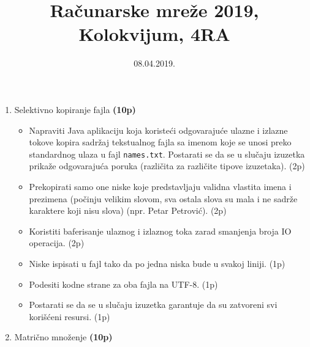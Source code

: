 \documentclass[]{article}
\title{Ra\v{c}unarske mre\v{z}e 2019, Kolokvijum, 4RA}
\author{}
\date{08.04.2019.}
\begin{document}
\maketitle

\begin{enumerate}
  \item Selektivno kopiranje fajla \textbf{(10p)}
  \begin{itemize}
    \item Napraviti Java aplikaciju koja koriste\'c{}i odgovaraju\'c{}e ulazne i izlazne tokove kopira sadr\v{z}aj tekstualnog fajla sa imenom koje se unosi preko standardnog ulaza u fajl \texttt{names.txt}. Postarati se da se u slu\v{c}aju izuzetka prika\v{z}e odgovaraju\'c{}a poruka (razli\v{c}ita za razli\v{c}ite tipove izuzetaka). \hfill (2p)
    \item Prekopirati samo one niske koje predstavljaju validna vlastita imena i prezimena (po\v{c}inju velikim slovom, sva ostala slova su mala i ne sadr\v{z}e karaktere koji nisu slova) (npr. Petar Petrovi\'c{}). \hfill (2p)
    \item Koristiti baferisanje ulaznog i izlaznog toka zarad smanjenja broja IO operacija. \hfill (2p)
    \item Niske ispisati u fajl tako da po jedna niska bude u svakoj liniji. \hfill (1p)
    \item Podesiti kodne strane za oba fajla na UTF-8. \hfill (1p)
    \item Postarati se da se u slu\v{c}aju izuzetka garantuje da su zatvoreni svi kori\v{s}\'c{}eni resursi. \hfill (1p)
  \end{itemize}

  \item Matri\v{c}no mno\v{z}enje \textbf{(10p)}


\end{enumerate}
\end{document}
